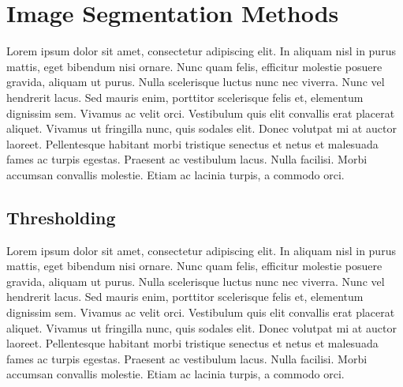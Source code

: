 \section{Image Segmentation Methods}\label{sec:3.3}
\vspace{-0.5cm}
\noindent Lorem ipsum dolor sit amet, consectetur adipiscing elit. In aliquam nisl in purus mattis, eget bibendum nisi ornare. Nunc quam felis, efficitur molestie posuere gravida, aliquam ut purus. Nulla scelerisque luctus nunc nec viverra. Nunc vel hendrerit lacus. Sed mauris enim, porttitor scelerisque felis et, elementum dignissim sem. Vivamus ac velit orci. Vestibulum quis elit convallis erat placerat aliquet. Vivamus ut fringilla nunc, quis sodales elit. Donec volutpat mi at auctor laoreet. Pellentesque habitant morbi tristique senectus et netus et malesuada fames ac turpis egestas. Praesent ac vestibulum lacus. Nulla facilisi. Morbi accumsan convallis molestie. Etiam ac lacinia turpis, a commodo orci.

\vspace{-0.3cm}

\subsection{Thresholding}\label{sec:3.3.1}
\vspace{-0.5cm}
\noindent  Lorem ipsum dolor sit amet, consectetur adipiscing elit. In aliquam nisl in purus mattis, eget bibendum nisi ornare. Nunc quam felis, efficitur molestie posuere gravida, aliquam ut purus. Nulla scelerisque luctus nunc nec viverra. Nunc vel hendrerit lacus. Sed mauris enim, porttitor scelerisque felis et, elementum dignissim sem. Vivamus ac velit orci. Vestibulum quis elit convallis erat placerat aliquet. Vivamus ut fringilla nunc, quis sodales elit. Donec volutpat mi at auctor laoreet. Pellentesque habitant morbi tristique senectus et netus et malesuada fames ac turpis egestas. Praesent ac vestibulum lacus. Nulla facilisi. Morbi accumsan convallis molestie. Etiam ac lacinia turpis, a commodo orci.

\vspace{-0.3cm}

